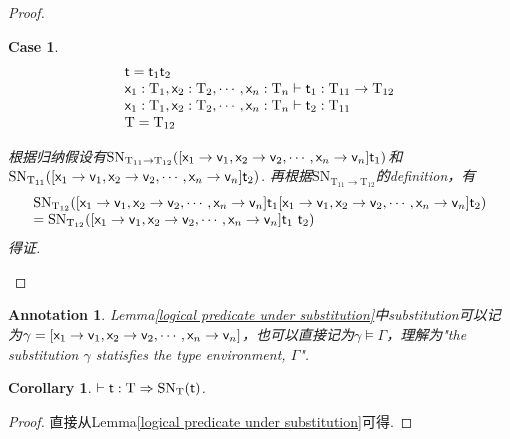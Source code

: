 \documentclass{article}
\theoremstyle{plain}
\newtheorem{corollary}[theorem]{Corollary}
\newtheorem{annotation}[theorem]{Annotation}
\newtheorem{case}{Case}
\theoremstyle{nonumberplain}
\newtheorem{proof}{Proof}
\newcommand{\singletype}[1]{\text{#1}}
\newcommand{\termtype}[2]{\ensuremath{#1:#2}}
\newcommand{\term}[1]{\ensuremath\mathsf{#1}}
\begin{document}
\begin{proof}
\begin{case}
$$
\begin{array}{ll}
\term{t} = \term{t}_1\term{t}_2 \\
\termtype{\term{x}_1}{\singletype{T}_1},\termtype{\term{x}_2}{\singletype{T}_2},\cdots,\termtype{\term{x}_n}{\singletype{T}_n} \vdash \termtype{\term{t}_1}{\singletype{T}_{11} \to \singletype{T}_{12}} \\
\termtype{\term{x}_1}{\singletype{T}_1},\termtype{\term{x}_2}{\singletype{T}_2},\cdots,\termtype{\term{x}_n}{\singletype{T}_n} \vdash \termtype{\term{t}_2}{\singletype{T}_{11}} \\
\singletype{T} = \singletype{T}_{12}
\end{array}
$$

根据归纳假设有$\text{SN}_{\singletype{T}_{11} \to \singletype{T}_{12}}([\term{x}_1 \to \term{v}_1,\term{x}_2 \to \term{v}_2,\cdots,\term{x}_n \to \term{v}_n]\term{t}_1)$和$\text{SN}_{\singletype{T}_{11}}([\term{x}_1 \to \term{v}_1,\term{x}_2 \to \term{v}_2,\cdots,\term{x}_n \to \term{v}_n]\term{t}_2)$. 再根据$\text{SN}_{\singletype{T}_{11} \to \singletype{T}_{12}}$的definition，有
$$
\begin{array}{ll}
\text{SN}_{\singletype{T}_{12}}([\term{x}_1 \to \term{v}_1,\term{x}_2 \to \term{v}_2,\cdots,\term{x}_n \to \term{v}_n]\term{t}_1 [\term{x}_1 \to \term{v}_1,\term{x}_2 \to \term{v}_2,\cdots,\term{x}_n \to \term{v}_n]\term{t}_2) \\
= \text{SN}_{\singletype{T}_{12}}([\term{x}_1 \to \term{v}_1,\term{x}_2 \to \term{v}_2,\cdots,\term{x}_n \to \term{v}_n]\term{t}_1~\term{t}_2) 
\end{array}
$$
得证.
\end{case}
\end{proof}

\begin{annotation}
\rm Lemma\ref{logical predicate under substitution}中substitution可以记为$\gamma = [\term{x}_1 \to \term{v}_1,\term{x}_2 \to \term{v}_2,\cdots,\term{x}_n \to \term{v}_n]$，也可以直接记为$\gamma \models \Gamma$，理解为"the substitution $\gamma$ statisfies the type environment, $\Gamma$". 
\end{annotation}

\begin{corollary}
\rm $\vdash \termtype{\term{t}}{\singletype{T}} \Rightarrow \text{SN}_\singletype{T}(\term{t})$.
\end{corollary}

\begin{proof}
\rm 直接从Lemma\ref{logical predicate under substitution}可得.
\end{proof}
\end{document}
